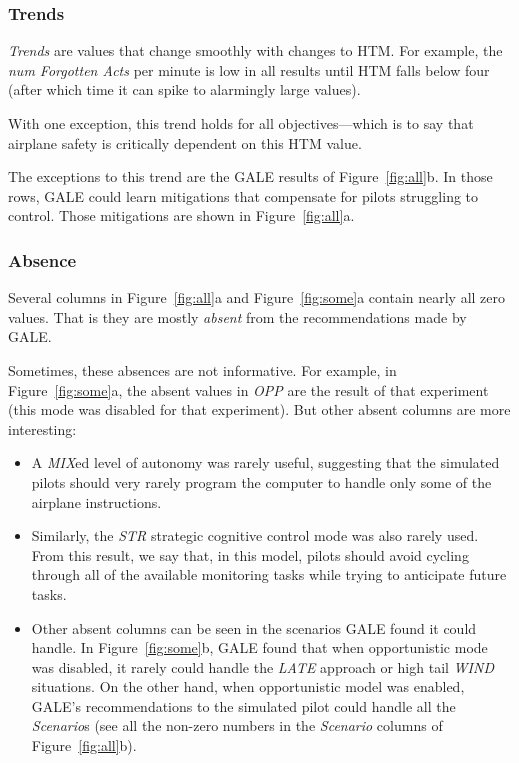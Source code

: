 \documentclass[journal]{IEEEtran}
\newcommand{\bi}{\begin{itemize}}
\newcommand{\ei}{\end{itemize}}
\newcommand{\fig}[1]{Figure~\ref{fig:#1}}
\begin{document}
\subsubsection{Trends}

{\em Trends} are  values that change  smoothly with changes to HTM. For example, the  {\em num Forgotten Acts} per minute is low in all results until HTM falls below four (after which time it can spike to alarmingly large values). 

With one exception, this trend holds for all objectives---which is to say that airplane safety is critically dependent on this HTM value.

The exceptions to this trend are the GALE results of \fig{all}b.  
In those rows, GALE could learn mitigations that compensate for pilots struggling to control. 
Those mitigations are shown in \fig{all}a. 
 

\subsubsection{Absence}

Several columns in \fig{all}a and \fig{some}a contain nearly all zero values. That is they are mostly {\em absent} from the recommendations made by GALE.

Sometimes, these absences are not informative.  
For example, in \fig{some}a, the absent values in {\em OPP} are the result of that experiment (this mode was disabled for that experiment).
But other absent columns are more interesting:
\bi
\item
A {\em MIX}ed level of autonomy was rarely useful, suggesting that the simulated pilots should very rarely program the computer to handle only some of the airplane instructions.
\item
Similarly, the {\em STR} strategic cognitive control mode was also rarely used.
From this result, we say that, in this model, pilots should avoid cycling through all of the available monitoring tasks while trying to anticipate future tasks.
\item Other absent columns can be seen in the scenarios GALE found it could handle. 
In \fig{some}b, GALE found that when opportunistic mode was disabled, it rarely could handle the {\em LATE} approach or high tail {\em WIND} situations.  
On the other hand, when opportunistic model was enabled, GALE's recommendations to the simulated pilot could handle all the {\em Scenario}s (see all the non-zero numbers in the {\em Scenario} columns of \fig{all}b).
\ei
\end{document}
